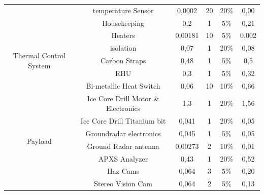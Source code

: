\begin{table}[hbt]
{\begin{tabular}{@{}cccccc@{}}
                                        & temperature Sensor                  & 0,0002                      & 20       & 20\%             & 0,00           \\
                                        & Housekeeping                        & 0,2                         & 1        & 5\%              & 0,21           \\ \midrule
\multirow{5}{*}{Thermal Control System} & Heaters                             & 0,00181                     & 10       & 5\%              & 0,002          \\
                                        & isolation                           & 0,07                        & 1        & 20\%             & 0,08           \\
                                        & Carbon Straps                       & 0,48                        & 1        & 5\%              & 0,5            \\
                                        & RHU                                 & 0,3                         & 1        & 5\%              & 0,32           \\
                                        & Bi-metallic Heat Switch             & 0,06                        & 10       & 10\%             & 0,66           \\ \midrule
\multirow{10}{*}{Payload}               & Ice Core Drill Motor \& Electronics & 1,3                         & 1        & 20\%             & 1,56           \\
                                        & Ice Core Drill Titanium bit         & 0,041                       & 1        & 20\%             & 0,05           \\
                                        & Groundradar electronics             & 0,045                       & 1        & 5\%              & 0,05           \\
                                        & Ground Radar antenna                & 0,00273                     & 2        & 10\%             & 0,01           \\
                                        & APXS Analyzer                       & 0,43                        & 1        & 20\%             & 0,52           \\
                                        & Haz Cams                            & 0,064                       & 3        & 5\%              & 0,20           \\
                                        & Stereo Vision Cam                   & 0,064                       & 2        & 5\%              & 0,13           \\

\end{tabular}}
\end{table}
